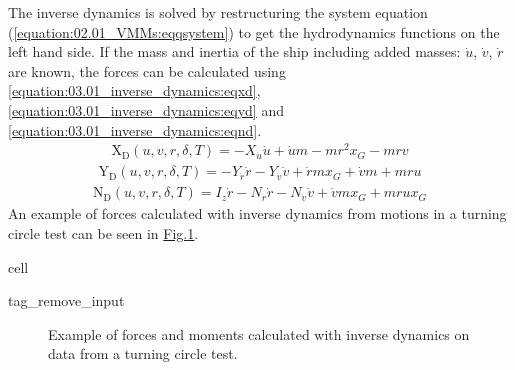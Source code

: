 \documentclass[review]{elsarticle}
\begin{document}
\sphinxAtStartPar
The inverse dynamics is solved by restructuring the system equation (\autoref{equation:02.01_VMMs:eqqsystem}) to get the hydrodynamics functions on the left hand side. If the mass and inertia of the ship including added masses: \(\dot{u}\), \(\dot{v}\), \(\dot{r}\) are known, the forces can be calculated using \autoref{equation:03.01_inverse_dynamics:eqxd}, \autoref{equation:03.01_inverse_dynamics:eqyd} and \autoref{equation:03.01_inverse_dynamics:eqnd}.
\begin{equation}\label{equation:03.01_inverse_dynamics:eqxd}
\begin{split}\displaystyle \operatorname{X_{D}}{\left(u,v,r,\delta,T \right)} = - X_{\dot{u}} \dot{u} + \dot{u} m - m r^{2} x_{G} - m r v\end{split}
\end{equation}\begin{equation}\label{equation:03.01_inverse_dynamics:eqyd}
\begin{split}\displaystyle \operatorname{Y_{D}}{\left(u,v,r,\delta,T \right)} = - Y_{\dot{r}} \dot{r} - Y_{\dot{v}} \dot{v} + \dot{r} m x_{G} + \dot{v} m + m r u\end{split}
\end{equation}\begin{equation}\label{equation:03.01_inverse_dynamics:eqnd}
\begin{split}\displaystyle \operatorname{N_{D}}{\left(u,v,r,\delta,T \right)} = I_{z} \dot{r} - N_{\dot{r}} \dot{r} - N_{\dot{v}} \dot{v} + \dot{v} m x_{G} + m r u x_{G}\end{split}
\end{equation}
\sphinxAtStartPar
An example of forces calculated with inverse dynamics from motions in a turning circle test can be seen in \hyperref[\detokenize{03.01_inverse_dynamics:fig-inverse}]{Fig.\@ \ref{\detokenize{03.01_inverse_dynamics:fig-inverse}}}.

\begin{sphinxuseclass}{cell}
\begin{sphinxuseclass}{tag_remove_input}
\end{sphinxuseclass}
\end{sphinxuseclass}
\begin{figure}[H]
\centering
\capstart

\noindent{}
\caption{Example of forces and moments calculated with inverse dynamics on data from a turning circle test.}\label{\detokenize{03.01_inverse_dynamics:fig-inverse}}\end{figure}
\end{document}
